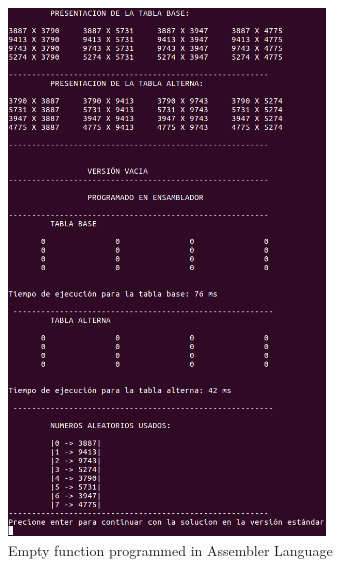 \documentclass[legalpaper,12pt]{article}
\begin{document}
\begin{figure}[htbp]
  \centering
    \includegraphics[width=0.75\textwidth]{Vacia_E.png}
  \caption{Empty function programmed in Assembler Language}
  \label{fig:vacia_e}
\end{figure}
\end{document}
